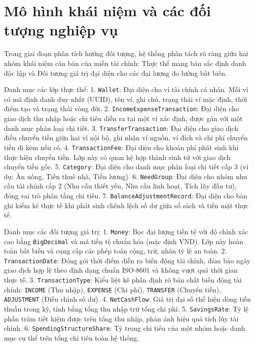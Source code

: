 \documentclass[a4paper,12pt]{report}
\newcommand{\passthrough}[1]{#1}
\begin{document}
\section{Mô hình khái niệm và các đối tượng nghiệp
vụ}\label{muxf4-huxecnh-khuxe1i-niux1ec7m-vuxe0-cuxe1c-ux111ux1ed1i-tux1b0ux1ee3ng-nghiux1ec7p-vux1ee5}

Trong giai đoạn phân tích hướng đối tượng, hệ thống phân tách rõ ràng
giữa hai nhóm khái niệm căn bản của miền tài chính: Thực thể mang bản
sắc định danh độc lập và Đối tượng giá trị đại diện cho các đại lượng đo
lường bất biến.

Danh mục các lớp thực thể: 1. \passthrough{\lstinline!Wallet!}: Đại diện
cho ví tài chính cá nhân. Mỗi ví có mã định danh duy nhất (UUID), tên
ví, ghi chú, trạng thái ví mặc định, thời điểm tạo và trạng thái vòng
đời. 2. \passthrough{\lstinline!IncomeExpenseTransaction!}: Đại diện cho
giao dịch thu nhập hoặc chi tiêu diễn ra tại một ví xác định, được gán
với một danh mục phân loại chi tiết. 3.
\passthrough{\lstinline!TransferTransaction!}: Đại diện cho giao dịch
điều chuyển tiền giữa hai ví nội bộ, ghi nhận ví nguồn, ví đích và chi
phí chuyển tiền đi kèm nếu có. 4.
\passthrough{\lstinline!TransactionFee!}: Đại diện cho khoản phí phát
sinh khi thực hiện chuyển tiền. Lớp này có quan hệ hợp thành sinh tử với
giao dịch chuyển tiền gốc. 5. \passthrough{\lstinline!Category!}: Đại
diện cho danh mục phân loại chi tiết cấp 3 (ví dụ: Ăn uống, Tiền thuê
nhà, Tiền lương). 6. \passthrough{\lstinline!NeedGroup!}: Đại diện cho
nhóm nhu cầu tài chính cấp 2 (Nhu cầu thiết yếu, Nhu cầu linh hoạt, Tích
lũy đầu tư), đóng vai trò phân tầng chi tiêu. 7.
\passthrough{\lstinline!BalanceAdjustmentRecord!}: Đại diện cho bản ghi
kiểm kê thực tế khi phát sinh chênh lệch số dư giữa sổ sách và tiền mặt
thực tế.

Danh mục các đối tượng giá trị: 1. \passthrough{\lstinline!Money!}: Bọc
đại lượng tiền tệ với độ chính xác cao bằng
\passthrough{\lstinline!BigDecimal!} và mã tiền tệ chuẩn hóa (mặc định
VND). Lớp này hoàn toàn bất biến và cung cấp các phép toán cộng, trừ,
nhân tỷ lệ an toàn. 2. \passthrough{\lstinline!TransactionDate!}: Đóng
gói thời điểm diễn ra biến động tài chính, đảm bảo ngày giao dịch hợp lệ
theo định dạng chuẩn ISO-8601 và không vượt quá thời gian thực tế. 3.
\passthrough{\lstinline!TransactionType!}: Kiểu liệt kê phân định rõ bản
chất biến động tài chính: \passthrough{\lstinline!INCOME!} (Thu nhập),
\passthrough{\lstinline!EXPENSE!} (Chi phí),
\passthrough{\lstinline!TRANSFER!} (Chuyển tiền),
\passthrough{\lstinline!ADJUSTMENT!} (Điều chỉnh số dư). 4.
\passthrough{\lstinline!NetCashFlow!}: Giá trị đại số thể hiện dòng tiền
thuần trong kỳ, tính bằng tổng thu nhập trừ tổng chi phí. 5.
\passthrough{\lstinline!SavingsRate!}: Tỷ lệ phần trăm tiết kiệm được
trên tổng thu nhập, phản ánh hiệu quả tích lũy tài chính. 6.
\passthrough{\lstinline!SpendingStructureShare!}: Tỷ trọng chi tiêu của
một nhóm hoặc danh mục cụ thể trên tổng chi tiêu toàn hệ thống.
\end{document}

